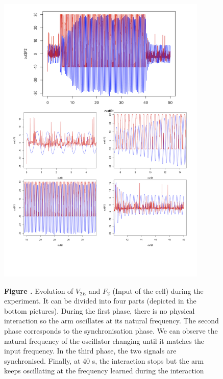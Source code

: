 \documentclass{report}
\begin{document}
\begin{figure}[h!]
\begin{center}
\includegraphics[width=10cm]{figures/F2-v2E.png}
\end{center}
 \textbf{\label{fig:05} Figure . }{Evolution of $V_{2E}$ and $F_2$ (Input of the cell) during the experiment. It can be divided into four parts (depicted in the bottom pictures). During the first phase, there is no physical interaction so the arm oscillates at its natural frequency. The second phase corresponds to the synchronisation phase. We can observe the natural frequency of the oscillator changing until it matches the input frequency. In the third phase, the two signals are synchronised. Finally, at 40 s, the interaction stops but the arm keeps oscillating at the frequency learned during the interaction}
\end{figure}
\end{document}
